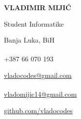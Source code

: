 \documentclass[9pt]{developercv} %
\begin{document}

\begin{minipage}[t]{0.45\textwidth}
	\vspace{-\baselineskip}
	
	{\Huge\textbf{\MakeUppercase{Vladimir Mijić}}}
	
	\vspace{6pt}
	
	{\huge Student Informatike}
\end{minipage}

\vspace{1cm}

\begin{minipage}[t]{0.3\textwidth}
    \vspace{-\baselineskip}
    
	{\faMapMarker \space}{Banja Luka, BiH}\\\\
	{\faPhone \space}{+387 66 070 193}\\
\end{minipage}
\hfill
\begin{minipage}[t]{0.3\textwidth}
	\vspace{-\baselineskip}
	
	{\faEnvelopeO \space}{\href{mailto:vladocodes@gmail.com}{vladocodes@gmail.com}}\\\\
	{\faEnvelopeO \space}{\href{mailto:vladomijic14@gmail.com}{vladomijic14@gmail.com}}\\
\end{minipage}
\hfill
\begin{minipage}[t]{0.3\textwidth}
	\vspace{-\baselineskip}
	
    {\faGithub \space}{\href{https://github.com/vladocodes}{github.com/vladocodes}}\\
\end{minipage}

\vspace{1.5cm}



\end{document}
